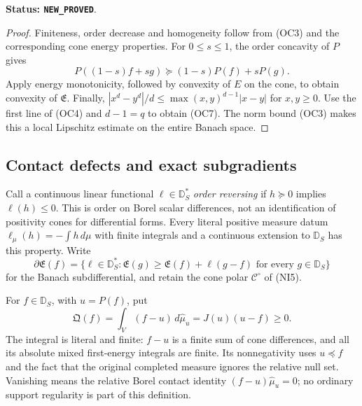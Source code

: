 \noindent\textbf{Status: \texttt{NEW\_PROVED}}.

\begin{proof}
Finiteness, order decrease and homogeneity follow from
\textup{(OC3)} and the corresponding cone energy properties.
For $0\le s\le1$, the order concavity of $P$ gives
\[
 P((1-s)f+sg)\succeq(1-s)P(f)+sP(g).
\]
Apply energy monotonicity, followed by convexity of $E$ on
the cone, to obtain convexity of $\mathfrak E$.  Finally,
$|x^d-y^d|/d\le\max(x,y)^{d-1}|x-y|$ for $x,y\ge0$.
Use the first line of \textup{(OC4)} and $d-1=q$ to obtain
\textup{(OC7)}.  The norm bound \textup{(OC3)} makes this a
local Lipschitz estimate on the entire Banach space.
\end{proof}

\subsection{Contact defects and exact subgradients}

Call a continuous linear functional $\ell\in\mathbb D_S^*$
\emph{order reversing} if $h\succeq0$ implies $\ell(h)\le0$.
This is order on Borel scalar differences, not an identification
of positivity cones for differential forms.  Every literal
positive measure datum $\ell_\mu(h)=-\int h\,d\mu$ with finite
integrals and a continuous extension to $\mathbb D_S$ has this
property.  Write
\[
 \partial\mathfrak E(f)=\{\ell\in\mathbb D_S^*:
 \mathfrak E(g)\ge\mathfrak E(f)+\ell(g-f)
                      \text{ for every }g\in\mathbb D_S\}
 \tag{OC8}
\]
for the Banach subdifferential, and retain the cone polar
$\mathscr C^\circ$ of \textup{(NI5)}.

\begin{definition}
\label{def:r12-relative-contact-defect}
For $f\in\mathbb D_S$, with $u=P(f)$, put
\[
 \mathfrak Q(f)=\int_V(f-u)\,d\widehat\mu_u
                         =J(u)(u-f)\ge0.
 \tag{OC9}
\]
The integral is literal and finite: $f-u$ is a finite sum of
cone differences, and all its absolute mixed first-energy
integrals are finite.  Its nonnegativity uses $u\preceq f$
and the fact that the original completed measure ignores the
relative null set.  Vanishing means the relative Borel
contact identity
$(f-u)\widehat\mu_u=0$; no ordinary support regularity is
part of this definition.
\end{definition}

